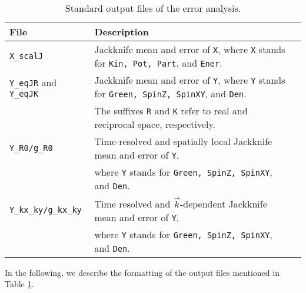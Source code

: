 \begin{table}[h]
	\begin{tabular}{@{} l l l @{}}\toprule
		File & Description \\\midrule
		\texttt{X\_scalJ} & Jackknife mean and error of \texttt{X}, where  \texttt{X} stands for \texttt{Kin, Pot, Part}, and \texttt{Ener}.\\
		\texttt{Y\_eqJR} and \texttt{Y\_eqJK} & Jackknife mean and error of \texttt{Y}, where \texttt{Y} stands for \texttt{Green, SpinZ, SpinXY}, and \texttt{Den}.\\
		& The suffixes \texttt{R} and \texttt{K} refer to real and reciprocal space, respectively.\\
		\texttt{Y\_R0/g\_R0} & Time-resolved and spatially local Jackknife mean and error of \texttt{Y},\\
		& where \texttt{Y} stands for \texttt{Green, SpinZ, SpinXY}, and \texttt{Den}.\\
		\texttt{Y\_kx\_ky/g\_kx\_ky} & Time resolved and $\vec{k}$-dependent Jackknife mean and error of \texttt{Y},\\
		& where \texttt{Y} stands for \texttt{Green, SpinZ, SpinXY}, and \texttt{Den}.\\\bottomrule
	\end{tabular}
	\caption{ Standard output files of the error analysis. \label{table:analysis_output}}
\end{table}
%
In the following, we describe the formatting of the output files mentioned in Table \ref{table:analysis_output}.
